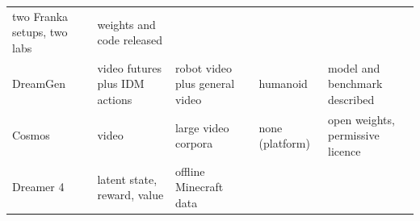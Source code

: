\documentclass[
  10pt,
  english,
]{article}
\begin{document}
\begin{longtable}[]{@{}lllll@{}}
\begin{minipage}[t]{0.17\columnwidth}
two Franka setups, two labs\strut
\end{minipage} & \begin{minipage}[t]{0.17\columnwidth}\raggedright
weights and code released\strut
\end{minipage}\tabularnewline
\begin{minipage}[t]{0.17\columnwidth}\raggedright
DreamGen \citep{dreamgen}\strut
\end{minipage} & \begin{minipage}[t]{0.17\columnwidth}\raggedright
video futures plus IDM actions\strut
\end{minipage} & \begin{minipage}[t]{0.17\columnwidth}\raggedright
robot video plus general video\strut
\end{minipage} & \begin{minipage}[t]{0.17\columnwidth}\raggedright
humanoid\strut
\end{minipage} & \begin{minipage}[t]{0.17\columnwidth}\raggedright
model and benchmark described\strut
\end{minipage}\tabularnewline
\begin{minipage}[t]{0.17\columnwidth}\raggedright
Cosmos \citep{cosmos}\strut
\end{minipage} & \begin{minipage}[t]{0.17\columnwidth}\raggedright
video\strut
\end{minipage} & \begin{minipage}[t]{0.17\columnwidth}\raggedright
large video corpora\strut
\end{minipage} & \begin{minipage}[t]{0.17\columnwidth}\raggedright
none (platform)\strut
\end{minipage} & \begin{minipage}[t]{0.17\columnwidth}\raggedright
open weights, permissive licence\strut
\end{minipage}\tabularnewline
\begin{minipage}[t]{0.17\columnwidth}\raggedright
Dreamer 4 \citep{dreamer4}\strut
\end{minipage} & \begin{minipage}[t]{0.17\columnwidth}\raggedright
latent state, reward, value\strut
\end{minipage} & \begin{minipage}[t]{0.17\columnwidth}\raggedright
offline Minecraft data\strut
\end{minipage} & \begin{minipage}[t]{0.17\columnwidth}\raggedright

\end{minipage}
\end{longtable}
\end{document}
